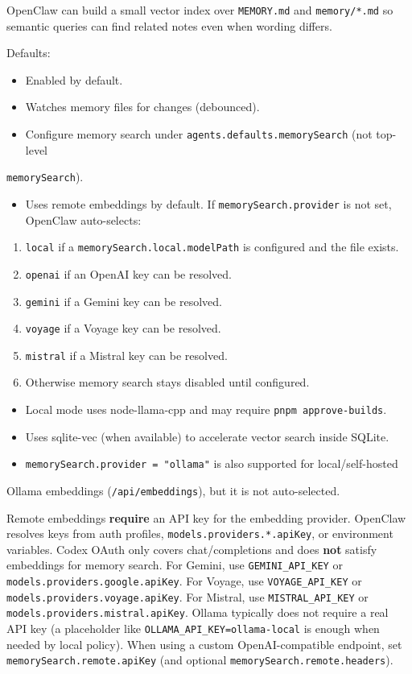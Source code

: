 OpenClaw can build a small vector index over \texttt{MEMORY.md} and \texttt{memory/*.md} so
semantic queries can find related notes even when wording differs.

Defaults:

\begin{itemize}
  \item Enabled by default.
  \item Watches memory files for changes (debounced).
  \item Configure memory search under \texttt{agents.defaults.memorySearch} (not top-level
\end{itemize}

\texttt{memorySearch}).
\begin{itemize}
  \item Uses remote embeddings by default. If \texttt{memorySearch.provider} is not set, OpenClaw auto-selects:
\end{itemize}

\begin{enumerate}
  \item \texttt{local} if a \texttt{memorySearch.local.modelPath} is configured and the file exists.
  \item \texttt{openai} if an OpenAI key can be resolved.
  \item \texttt{gemini} if a Gemini key can be resolved.
  \item \texttt{voyage} if a Voyage key can be resolved.
  \item \texttt{mistral} if a Mistral key can be resolved.
  \item Otherwise memory search stays disabled until configured.
\end{enumerate}

\begin{itemize}
  \item Local mode uses node-llama-cpp and may require \texttt{pnpm approve-builds}.
  \item Uses sqlite-vec (when available) to accelerate vector search inside SQLite.
  \item \texttt{memorySearch.provider = "ollama"} is also supported for local/self-hosted
\end{itemize}

Ollama embeddings (\texttt{/api/embeddings}), but it is not auto-selected.

Remote embeddings \textbf{require} an API key for the embedding provider. OpenClaw
resolves keys from auth profiles, \texttt{models.providers.*.apiKey}, or environment
variables. Codex OAuth only covers chat/completions and does \textbf{not} satisfy
embeddings for memory search. For Gemini, use \texttt{GEMINI\_API\_KEY} or
\texttt{models.providers.google.apiKey}. For Voyage, use \texttt{VOYAGE\_API\_KEY} or
\texttt{models.providers.voyage.apiKey}. For Mistral, use \texttt{MISTRAL\_API\_KEY} or
\texttt{models.providers.mistral.apiKey}. Ollama typically does not require a real API
key (a placeholder like \texttt{OLLAMA\_API\_KEY=ollama-local} is enough when needed by
local policy).
When using a custom OpenAI-compatible endpoint,
set \texttt{memorySearch.remote.apiKey} (and optional \texttt{memorySearch.remote.headers}).


